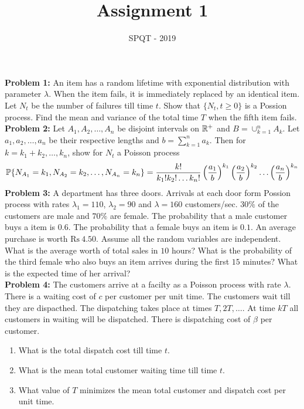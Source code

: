 \documentclass[a4paper,10pt,english]{article}
\title{Assignment 1}
\author{SPQT - 2019}
\begin{document}
\maketitle
\textbf{Problem 1:} An item has a random lifetime with exponential distribution with parameter $\lambda$. When the item fails, it is immediately replaced by an identical item. Let $N_t$ be the number of failures till time $t$. Show that $\{N_t, t \geq 0\}$ is a Possion process. Find the mean and variance of the total time $T$ when the fifth item fails. \\
\indent \textbf{Problem 2:} Let $A_1, A_2, \ldots, A_n$ be disjoint intervals on $\R^+$ and $B = \cup_{k=1}^n A_k$. Let $a_1,a_2,\ldots,a_n$ be their respective lengths and $b = \sum_{k=1}^n a_k$. Then for $k = k_1+k_2,\ldots,k_n$, show for $N_t$ a Poisson process
\begin{align*}
\P\{N_{A_1}=k_1,N_{A_2}=k_2,\ldots,N_{A_n}=k_n\} = \frac{k!}{k_1!k_2!\ldots k_n!}\left(\frac{a_1}{b}\right)^{k_1}\left(\frac{a_2}{b}\right)^{k_2}\ldots\left(\frac{a_n}{b}\right)^{k_n}
\end{align*}
\indent \textbf{Problem 3:} A department has three doors. Arrivals at each door form Possion process with rates $\lambda_1 = 110$, $\lambda_2 = 90$ and $\lambda = 160$ customers/sec. $30\%$ of the customers are male and $70\%$ are female. The probability that a male customer buys a item is $0.6$. The probability that a female buys an item is $0.1$. An average purchase is worth $\mathrm{Rs}\ 4.50$. Assume all the random variables are independent. What is the average worth of total sales in $10$ hours? What is the probability of the third female who also buys an item arrives during the first $15$ minutes? What is the expected time of her arrival?\\
\indent \textbf{Problem 4:} The customers arrive at a facilty as a Poisson process with rate $\lambda$. There is a waiting cost of $c$ per customer per unit time. The customers wait till they are dispacthed. The dispatching takes place at times $T,2T,\ldots$. At time $kT$ all customers in waiting will be dispatched. There is dispatching cost of $\beta$ per customer. 
\begin{enumerate}
\item What is the total dispatch cost till time $t$.
\item What is the mean total customer waiting time till time $t$.
\item What value of $T$ minimizes the mean total customer and dispatch cost per unit time. 
\end{enumerate}
\end{document}
